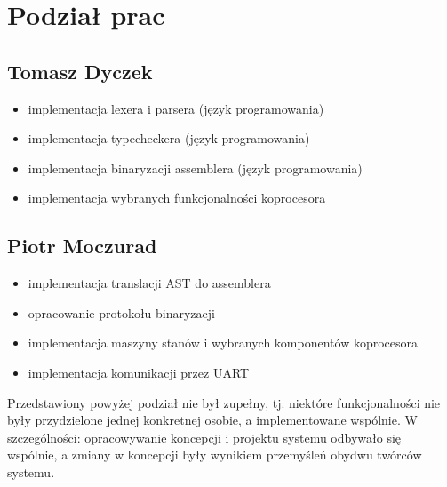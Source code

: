 \section{Podział prac}
\subsection{Tomasz Dyczek}
\begin{itemize}
  \item implementacja lexera i parsera (język programowania)
  \item implementacja typecheckera (język programowania)
  \item implementacja binaryzacji assemblera (język programowania)
  \item implementacja wybranych funkcjonalności koprocesora
\end{itemize}

\subsection{Piotr Moczurad}
\begin{itemize}
  \item implementacja translacji AST do assemblera
  \item opracowanie protokołu binaryzacji
  \item implementacja maszyny stanów i wybranych komponentów koprocesora
  \item implementacja komunikacji przez UART
\end{itemize}

Przedstawiony powyżej podział nie był zupełny, tj. niektóre funkcjonalności nie były przydzielone jednej konkretnej osobie, a implementowane wspólnie. W szczególności: opracowywanie koncepcji i projektu systemu odbywało się wspólnie, a zmiany w koncepcji były wynikiem przemyśleń obydwu twórców systemu.
